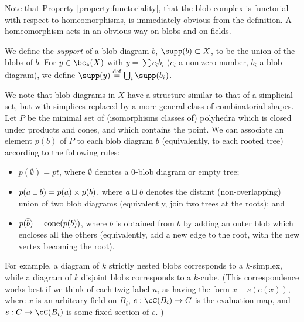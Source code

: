 Note that Property \ref{property:functoriality}, that the blob complex is functorial with respect to homeomorphisms, 
is immediately obvious from the definition.
A homeomorphism acts in an obvious way on blobs and on fields.

We define the {\it support} of a blob diagram $b$, $\supp(b) \sub X$, 
to be the union of the blobs of $b$.
For $y \in \bc_*(X)$ with $y = \sum c_i b_i$ ($c_i$ a non-zero number, $b_i$ a blob diagram),
we define $\supp(y) \deq \bigcup_i \supp(b_i)$.

We note that blob diagrams in $X$ have a structure similar to that of a simplicial set,
but with simplices replaced by a more general class of combinatorial shapes.
Let $P$ be the minimal set of (isomorphisms classes of) polyhedra which is closed under products
and cones, and which contains the point.
We can associate an element $p(b)$ of $P$ to each blob diagram $b$ 
(equivalently, to each rooted tree) according to the following rules:
\begin{itemize}
\item $p(\emptyset) = pt$, where $\emptyset$ denotes a 0-blob diagram or empty tree;
\item $p(a \sqcup b) = p(a) \times p(b)$, where $a \sqcup b$ denotes the distant (non-overlapping) union 
of two blob diagrams (equivalently, join two trees at the roots); and
\item $p(\bar{b}) = \operatorname{cone}(p(b))$, where $\bar{b}$ is obtained from $b$ by adding an outer blob which 
encloses all the others (equivalently, add a new edge to the root, with the new vertex becoming the root).
\end{itemize}
For example, a diagram of $k$ strictly nested blobs corresponds to a $k$-simplex, while
a diagram of $k$ disjoint blobs corresponds to a $k$-cube.
(This correspondence works best if we think of each twig label $u_i$ as having the form
$x - s(e(x))$, where $x$ is an arbitrary field on $B_i$, $e: \cC(B_i) \to C$ is the evaluation map, 
and $s:C \to \cC(B_i)$ is some fixed section of $e$. )


